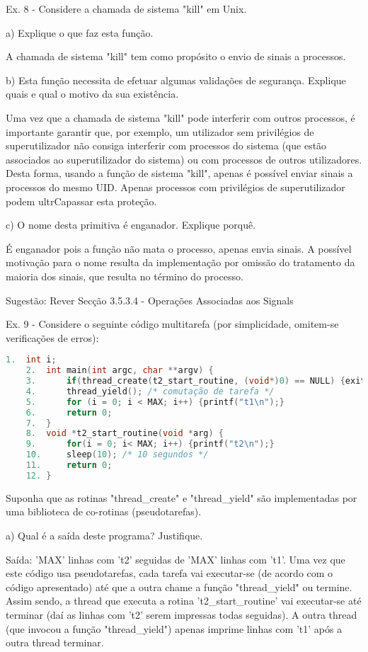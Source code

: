 \documentclass[11pt]{article}
\begin{document}
Ex. 8 - Considere a chamada de sistema "kill" em Unix.

a) Explique o que faz esta função.

A chamada de sistema "kill" tem como propósito o envio de sinais a processos.

b) Esta função necessita de efetuar algumas validações de segurança. Explique quais e qual o motivo da sua existência.

Uma vez que a chamada de sistema "kill" pode interferir com outros processos, é importante garantir que, por exemplo, um utilizador sem privilégios de superutilizador não consiga interferir com processos do sistema (que estão associados ao superutilizador do sistema) ou com processos de outros utilizadores. Desta forma, usando a função de sistema "kill", apenas é possível enviar sinais a processos do mesmo UID. Apenas processos com privilégios de superutilizador podem ultrCapassar esta proteção.

c) O nome desta primitiva é enganador. Explique porquê.

É enganador pois a função não mata o processo, apenas envia sinais. A possível motivação para o nome resulta da implementação por omissão do tratamento da maioria dos sinais, que resulta no término do processo.

Sugestão: Rever Secção 3.5.3.4 - Operações Associadas aos Signals

Ex. 9 - Considere o seguinte código multitarefa (por simplicidade, omitem-se verificações de erros):

\begin{lstlisting}[language=C]
    1.  int i;
    2.  int main(int argc, char **argv) {
    3.      if(thread_create(t2_start_routine, (void*)0) == NULL) {exit(1);}
    4.      thread_yield(); /* comutação de tarefa */
    5.      for (i = 0; i < MAX; i++) {printf("t1\n");}
    6.      return 0;
    7.  }
    8.  void *t2_start_routine(void *arg) {
    9.      for(i = 0; i< MAX; i++) {printf("t2\n");}
    10.     sleep(10); /* 10 segundos */
    11.     return 0;
    12. }
\end{lstlisting}

Suponha que as rotinas "thread\_create" e "thread\_yield" são implementadas por uma biblioteca de co-rotinas (pseudotarefas).

a) Qual é a saída deste programa? Justifique.

Saída: 'MAX' linhas com 't2' seguidas de 'MAX' linhas com 't1'. Uma vez que este código usa pseudotarefas, cada tarefa vai executar-se (de acordo com o código apresentado) até que a outra chame a função "thread\_yield" ou termine. Assim sendo, a thread que executa a rotina 't2\_start\_routine' vai executar-se até terminar (daí as linhas com 't2' serem impressas todas seguidas). A outra thread (que invocou a função "thread\_yield") apenas imprime linhas com 't1' após a outra thread terminar.
\end{document}
